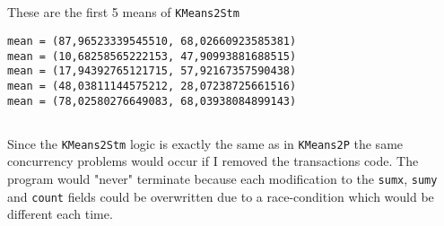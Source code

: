 \subsection{}
These are the first 5 means of \texttt{KMeans2Stm}
\begin{lstlisting}
mean = (87,96523339545510, 68,02660923585381)
mean = (10,68258565222153, 47,90993881688515)
mean = (17,94392765121715, 57,92167357590438)
mean = (48,03811144575212, 28,07238725661516)
mean = (78,02580276649083, 68,03938084899143)
\end{lstlisting}

\subsection{}
Since the \texttt{KMeans2Stm} logic is exactly the same as in \texttt{KMeans2P} the same concurrency problems would occur if I removed the transactions code. The program would "never" terminate because each modification to the \texttt{sumx}, \texttt{sumy} and \texttt{count} fields could be overwritten due to a race-condition which would be different each time.
